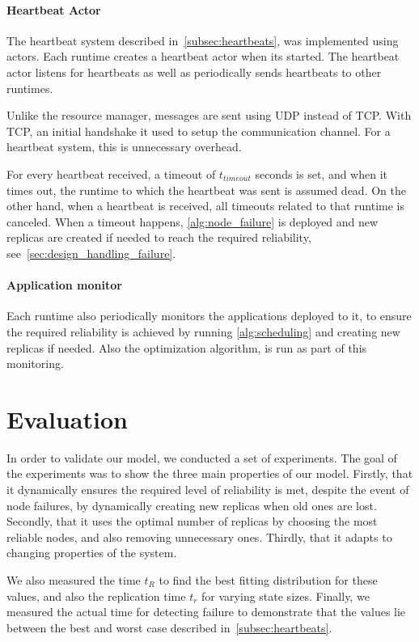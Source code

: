 \documentclass{cslthse-msc}
\begin{document}
\subsubsection{Heartbeat Actor}
The heartbeat system described in~\cref{subsec:heartbeats}, was implemented using actors. Each runtime creates a heartbeat actor when its started. The heartbeat actor listens for heartbeats as well as periodically sends heartbeats to other runtimes.

Unlike the resource manager, messages are sent using UDP instead of TCP. With TCP, an initial handshake it used to setup the communication channel. For a heartbeat system, this is unnecessary overhead. 

For every heartbeat received, a timeout of $t_{timeout}$ seconds is set, and when it times out, the runtime to which the heartbeat was sent is assumed dead. On the other hand, when a heartbeat is received, all timeouts related to that runtime is canceled. When a timeout happens, \cref{alg:node_failure} is deployed and new replicas are created if needed to reach the required reliability, see~\cref{sec:design_handling_failure}.

\subsubsection{Application monitor}
Each runtime also periodically monitors the applications deployed to it, to ensure the required reliability is achieved by running \cref{alg:scheduling} and creating new replicas if needed. Also the optimization algorithm, is run as part of this monitoring.

\chapter{Evaluation} \label{ch:evaluation}
In order to validate our model, we conducted a set of experiments. The goal of the experiments was to show the three main properties of our model. Firstly, that it dynamically ensures the required level of reliability is met, despite the event of node failures, by dynamically creating new replicas when old ones are lost. Secondly, that it uses the optimal number of replicas by choosing the most reliable nodes, and also removing unnecessary ones. Thirdly, that it adapts to changing properties of the system. 

We also measured the time $t_R$ to find the best fitting distribution for these values, and also the replication time $t_r$ for varying state sizes. Finally, we measured the actual time for detecting failure to demonstrate that the values lie between the best and worst case described in~\cref{subsec:heartbeats}.
\end{document}
